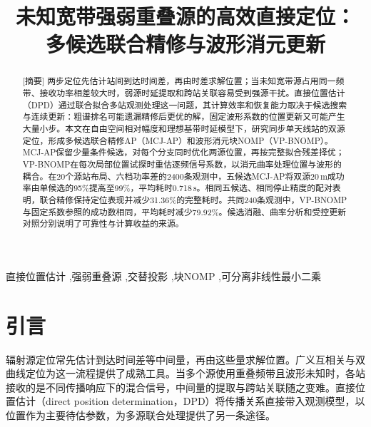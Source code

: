 \documentclass[a4paper,fleqn]{cas-sc}
\numberwithin{equation}{section}
\numberwithin{figure}{section}
\numberwithin{table}{section}
\begin{document}
\let\WriteBookmarks\relax
{}
\shortauthors{}
\title[mode=title]{未知宽带强弱重叠源的高效直接定位：\\多候选联合精修与波形消元更新}

\begin{abstract}[摘要]
两步定位先估计站间到达时间差，再由时差求解位置；当未知宽带源占用同一频带、接收功率相差较大时，弱源时延提取和跨站关联容易受到强源干扰。直接位置估计（DPD）通过联合拟合多站观测处理这一问题，其计算效率和恢复能力取决于候选搜索与连续更新：粗谱排名可能遗漏精修后更优的解，固定波形系数的位置更新又可能产生大量小步。本文在自由空间相对幅度和理想基带时延模型下，研究同步单天线站的双源定位，形成多候选联合精修AP（MCJ-AP）和波形消元块NOMP（VP-BNOMP）。MCJ-AP保留少量条件候选，对每个分支同时优化两源位置，再按完整拟合残差择优；VP-BNOMP在每次局部位置试探时重估逐频信号系数，以消元曲率处理位置与波形的耦合。在20个源站布局、六档功率差的2400条观测中，五候选MCJ-AP将双源20\,m成功率由单候选的95\%提高至99\%，平均耗时0.718\,s。相同五候选、相同停止精度的配对表明，联合精修保持定位表现并减少31.36\%的完整耗时。共同240条观测中，VP-BNOMP与固定系数参照的成功数相同，平均耗时减少79.92\%。候选消融、曲率分析和受控更新对照分别说明了可靠性与计算收益的来源。
\end{abstract}
\begin{keywords}[关键词]
直接位置估计 \sep 强弱重叠源 \sep 交替投影 \sep 块NOMP \sep 可分离非线性最小二乘
\end{keywords}


\maketitle

\section{引言}\label{sec:introduction}
辐射源定位常先估计到达时间差等中间量，再由这些量求解位置。广义互相关与双曲线定位为这一流程提供了成熟工具\cite{KnappCarter1976,ChanHo1994}。当多个源使用重叠频带且波形未知时，各站接收的是不同传播响应下的混合信号，中间量的提取与跨站关联随之变难。直接位置估计（direct position determination，DPD）将传播关系直接带入观测模型，以位置作为主要待估参数，为多源联合处理提供了另一条途径\cite{ChenHudsonYao2002,WeissAmar2005}。
\end{document}
